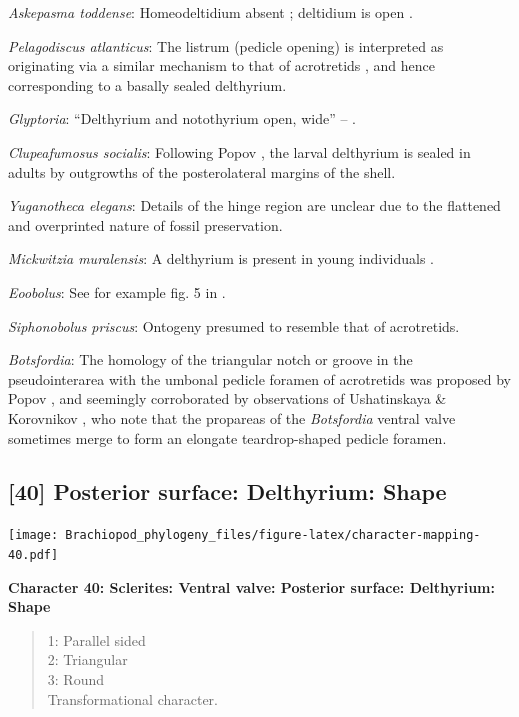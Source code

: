 \documentclass[openany]{book}
\theoremstyle{definition}
\theoremstyle{definition}
\theoremstyle{definition}
\theoremstyle{remark}
\begin{document}
\emph{Askepasma toddense}: Homeodeltidium absent
\citep[p.~153]{Williams2000BrachiopodaLinguliformea}; deltidium is open
\citep[see][fig. 4]{Topper2013Theoldest}.

\emph{Pelagodiscus atlanticus}: The listrum (pedicle opening) is
interpreted as originating via a similar mechanism to that of
acrotretids \citep{Popov1992TheCambrian}, and hence corresponding to a
basally sealed delthyrium.

\emph{Glyptoria}: ``Delthyrium and notothyrium open, wide'' --
\citet{Cooper1976LowerCambrian}.

\emph{Clupeafumosus socialis}: Following Popov
\citeyearpar{Popov1992TheCambrian}, the larval delthyrium is sealed in
adults by outgrowths of the posterolateral margins of the shell.

\emph{Yuganotheca elegans}: Details of the hinge region are unclear due
to the flattened and overprinted nature of fossil preservation.

\emph{Mickwitzia muralensis}: A delthyrium is present in young
individuals \citep{Balthasar2004Shellstructure}.

\emph{Eoobolus}: See for example fig. 5 in
\citet{Balthasar2009Thebrachiopod}.

\emph{Siphonobolus priscus}: Ontogeny presumed to resemble that of
acrotretids.

\emph{Botsfordia}: The homology of the triangular notch or groove in the
pseudointerarea with the umbonal pedicle foramen of acrotretids was
proposed by Popov \citeyearpar{Popov1992TheCambrian}, and seemingly
corroborated by observations of Ushatinskaya \& Korovnikov
\citeyearpar{Ushatinskaya2016Revisionof}, who note that the propareas of
the \emph{Botsfordia} ventral valve sometimes merge to form an elongate
teardrop-shaped pedicle foramen.

\hypertarget{posterior-surface-delthyrium-shape}{%
\subsection*{{[}40{]} Posterior surface: Delthyrium:
Shape}\label{posterior-surface-delthyrium-shape}}

\texttt{[image: Brachiopod\_phylogeny\_files/figure-latex/character-mapping-40.pdf]}

\textbf{Character 40: Sclerites: Ventral valve: Posterior surface:
Delthyrium: Shape}

\begin{quote}
1: Parallel sided\\
2: Triangular\\
3: Round\\
Transformational character.
\end{quote}
\end{document}
